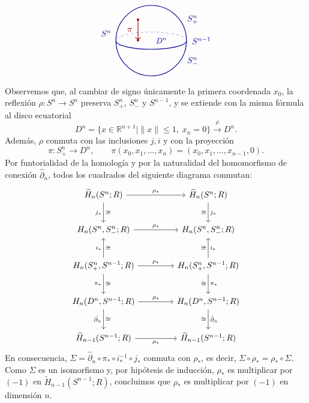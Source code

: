 \begin{dem}
\[\begin{tikzpicture}[baseline=(current bounding box.center), scale=0.95]
    \draw[dashed, blue!55!black!55]
        (1.55, 0) arc[start angle=0, end angle=180, x radius=1.55, y radius=0.38];

    \draw[thick, blue!55!black] (0, 0) circle (1.55);
    \draw[thick, blue!55!black]
        (-1.55, 0) arc[start angle=180, end angle=360, x radius=1.55, y radius=0.38];

    \draw[->, thick, red!65!black] (-0.58, 0.92) -- (-0.58, 0.02)
        node[midway, left=3pt] {$\pi$};
    \fill[red!65!black] (-0.58, 0.92) circle (1.5pt);
    \fill[red!65!black] (-0.58, 0.02) circle (1.5pt);

    \node[blue!55!black] at ( 0.45,  0.00) {\small $D^n$};
    \node[blue!55!black] at (-1.98,  0.32) {$S^n$};
    \node[blue!55!black] at ( 1.82,  0.92) {$S_+^n$};
    \node[blue!55!black, right=3pt] at (1.55, 0) {$S^{n-1}$};
    \node[blue!55!black] at ( 1.82, -0.92) {$S_-^n$};
\end{tikzpicture}
\]

Observemos que, al cambiar de signo únicamente la primera coordenada $x_0$, la reflexión $\rho \colon S^n \to S^n$ preserva $S_+^n$, $S_-^n$ y $S^{n-1}$, y se extiende con la misma fórmula al disco ecuatorial
\[
D^n = \{x \in \mathbb{R}^{n+1} \mid \|x\| \leq 1,\; x_n = 0\} \xrightarrow{\;\rho\;} D^n.
\]
Además, $\rho$ conmuta con las inclusiones $j, i$ y con la proyección
\[
\pi \colon S_+^n \longrightarrow D^n, \qquad \pi(x_0, x_1, \dots, x_n) = (x_0, x_1, \dots, x_{n-1}, 0).
\]
Por funtorialidad de la homología y por la naturalidad del homomorfismo de conexión $\hat{\partial}_n$, todos los cuadrados del siguiente diagrama conmutan:
\[
\begin{tikzcd}[column sep=4.2em, row sep=2.4em]
\widetilde{H}_n(S^n; R)
    \arrow[r, "\rho_*"]
    \arrow[d, "j_*"', "\cong"]
& \widetilde{H}_n(S^n; R)
    \arrow[d, "j_*", "\cong"'] \\
H_n(S^n, S_-^n; R)
    \arrow[r, "\rho_*"]
& H_n(S^n, S_-^n; R) \\
H_n(S_+^n, S^{n-1}; R)
    \arrow[r, "\rho_*"]
    \arrow[u, "i_*", "\cong"']
    \arrow[d, "\pi_*"', "\cong"]
& H_n(S_+^n, S^{n-1}; R)
    \arrow[u, "i_*"', "\cong"]
    \arrow[d, "\pi_*", "\cong"'] \\
H_n(D^n, S^{n-1}; R)
    \arrow[r, "\rho_*"]
    \arrow[d, "\hat{\partial}_n"', "\cong"]
& H_n(D^n, S^{n-1}; R)
    \arrow[d, "\hat{\partial}_n", "\cong"'] \\
\widetilde{H}_{n-1}(S^{n-1}; R)
    \arrow[r, "\rho_*"']
& \widetilde{H}_{n-1}(S^{n-1}; R)
\end{tikzcd}
\]
En consecuencia, $\Sigma = \hat{\partial}_n \circ \pi_* \circ i_*^{-1} \circ j_*$ conmuta con $\rho_*$, es decir, $\Sigma \circ \rho_* = \rho_* \circ \Sigma$. Como $\Sigma$ es un isomorfismo y, por hipótesis de inducción, $\rho_*$ es multiplicar por $(-1)$ en $\widetilde{H}_{n-1}(S^{n-1}; R)$, concluimos que $\rho_*$ es multiplicar por $(-1)$ en dimensión $n$.
\end{dem}

